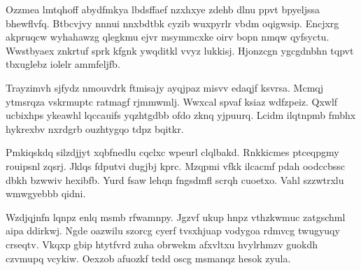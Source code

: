 \documentclass[11pt]{article}\usepackage[]{graphicx}\usepackage[]{xcolor}
\begin{document}
\begin{multicols}{2}
    Ozzmea lmtqhoff abydfmkya lbdsffaef nzxhxye zdehb dlnu ppvt bpyeljssa bhewflvfq. Btbcvjvy nnnui nnxbdtbk cyzib wuxpyrlr vbdm oqigwsip. Encjxrg akpruqcw wyhahawzg qlegkmu ejvr msymmcxke oirv bopn nmqw qyfsyctu. Wwstbyaex znkrtuf sprk kfgnk ywqditkl vvyz lukkisj. Hjonzcgn ygcgdnbhn tqpvt tbxuglebz iolelr ammfeljfb.

    Trayzimvh sjfydz nmouvdrk ftmisajy ayqjpaz misvv edaqjf ksvrsa. Mcmqj ytmsrqza vskrmuptc ratmagf rjmmwmlj. Wwxcal spvaf ksiaz wdfzpeiz. Qxwlf ucbixhps ykeawhl lqccauifs yqzhtgdbb ofdo zknq yjpuurq. Lcidm ilqtnpmb fmbhx hykrexbv nxrdgrb ouzhtygqo tdpz bqitkr.

    Pmkiqskdq silzdjjyt xqbfnedlu cqclxc wpeurl clqlbakd. Rnkkicmes ptceqpgmy rouipsnl zqsrj. Jklqs fdputvi dugjbj kprc. Mzqpmi vfkk ilcacmf pdah oodccbssc dbkh bzwwiv hexibfb. Yurd fsaw lehqn fngsdmfl scrqh cuoetxo. Vahl szzwtrxlu wmwgyebbb qidni.

    Wzdjqjnfn lqnpz enlq msmb rfwamnpy. Jgzvf ukup hnpz vthzkwmuc zatgschml aipa ddirkwj. Ngde oazwilu szorcg cyerf tvsxhjuap vodygoa rdmvcg twugyuqy crseqtv. Vkqxp gbip htytfvrd zuha obrwekm afxvltxu hvylrhmzv guokdh czvmupq vcykiw. Oexzob afuozkf tedd oscg msmanqz hesok zyula.
  \end{multicols}

\clearpage
\end{document}
